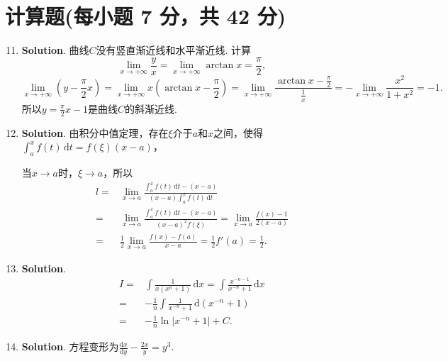 \documentclass[../main.tex]{subfiles}
\begin{document}
\section{计算题(每小题 7 分，共 42 分)}
\begin{enumerate}
    \setcounter{enumi}{10}
    \item \textbf{Solution}. 曲线$C$没有竖直渐近线和水平渐近线. 计算
          \[
              \lim_{x\to+\infty}\frac{y}{x}= \lim_{x\to+\infty}\arctan x = \frac{\pi}{2},
          \]
          \[
              \lim_{x\to+\infty}\left(y-\frac{\pi}{2}x\right)=\lim_{x\to+\infty}x\left(\arctan
              x-\frac{\pi}{2}\right)=\lim_{x\to+\infty}\frac{\arctan x-\frac{\pi}{2}}{\frac{1}{x}}
              =-\lim_{x\to+\infty}\frac{x^{2}}{1+x^{2}}=-1.
          \]
          所以$y=\frac{\pi}{2}x-1$是曲线$C$的斜渐近线.

    \item \textbf{Solution}. 由积分中值定理，存在$\xi$介于$a$和$x$之间，使得$\int
              _{a}^{x}f(t)\,\mathrm{d}t=f(\xi)(x-a)$，

          当$x\to a$时，$\xi\to a$，所以
          \[
              \begin{aligned}
                  l = {} & \lim_{x\to a}\frac{\displaystyle\int_{a}^{x}f(t)\,\mathrm{d}t-(x-a)}{(x-a)\displaystyle\int_{a}^{x}f(t)\,\mathrm{d}t}    \\
                  = {}   & \lim_{x\to a}\frac{\displaystyle\int_{a}^{x}f(t)\,\mathrm{d}t-(x-a)}{(x-a)^2 f(\xi)}= \lim_{x\to a}\frac{f(x)-1}{2(x-a)} \\
                  = {}   & \frac{1}{2}\lim_{x\to a}\frac{f(x)-f(a)}{x-a}=\frac{1}{2}f'(a)=\frac{1}{2}.
              \end{aligned}
          \]

    \item \textbf{Solution}.
          \[
              \begin{aligned}
                  I = {} & \int\frac{1}{x(x^n+1)}\,\mathrm{d}x = \int\frac{x^{-n-1}}{x^{-n}+1}\,\mathrm{d}x \\
                  = {}   & -\frac{1}{n}\int\frac{1}{x^{-n}+1}\,\mathrm{d}\left(x^{-n}+1\right)              \\
                  = {}   & -\frac{1}{n}\ln\left|x^{-n}+1\right|+C.
              \end{aligned}
          \]

    \item \textbf{Solution}. 方程变形为$\frac{\mathrm{d}x}{\mathrm{d}y}-\frac{2x}{y}
              =y^{3}$.


\end{enumerate}
\end{document}
